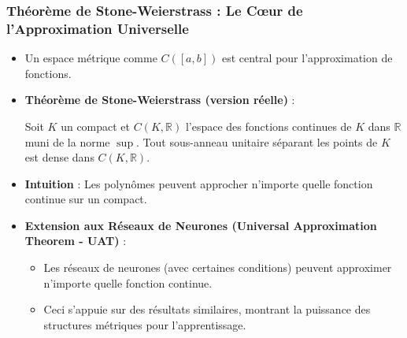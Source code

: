 \documentclass{beamer}
\begin{document}
\begin{frame}
    \frametitle{Théorème de Stone-Weierstrass : Le Cœur de l'Approximation Universelle}
    \begin{itemize}
        \item Un espace métrique comme $C([a,b])$ est central pour l'approximation de fonctions.
        \item \textbf{Théorème de Stone-Weierstrass (version réelle)} :
            \begin{block}{}
                Soit $K$ un compact et $C(K, \mathbb{R})$ l'espace des fonctions continues de $K$ dans $\mathbb{R}$ muni de la norme $\sup$. Tout sous-anneau unitaire séparant les points de $K$ est dense dans $C(K, \mathbb{R})$.
            \end{block}
        \item \textbf{Intuition} : Les polynômes peuvent approcher n'importe quelle fonction continue sur un compact.
        \item \textbf{Extension aux Réseaux de Neurones (Universal Approximation Theorem - UAT)} :
            \begin{itemize}
                \item Les réseaux de neurones (avec certaines conditions) peuvent approximer n'importe quelle fonction continue.
                \item Ceci s'appuie sur des résultats similaires, montrant la puissance des structures métriques pour l'apprentissage.
            \end{itemize}
    \end{itemize}
\end{frame}

\end{document}
